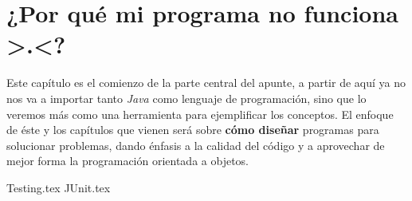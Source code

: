 \chapter{¿Por qué mi programa no funciona >.<?}

  Este capítulo es el comienzo de la parte central del apunte, a partir de aquí ya no nos va a 
  importar tanto \textit{Java} como lenguaje de programación, sino que lo veremos más como una 
  herramienta para ejemplificar los conceptos.
  El enfoque de éste y los capítulos que vienen será sobre \textbf{cómo diseñar} programas para
  solucionar problemas, dando énfasis a la calidad del código y a aprovechar de mejor forma la 
  programación orientada a objetos.

  {Testing.tex}
  {JUnit.tex}
  
  \nocite{*}
  \printbibliography[keyword=tdd]
